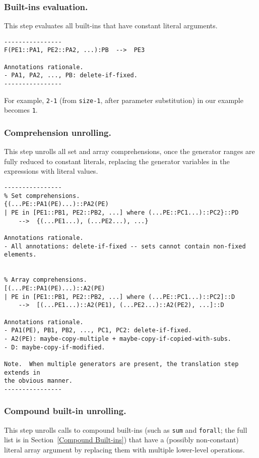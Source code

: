 \documentclass[10pt]{article}
\begin{document}
\subsubsection{Built-ins evaluation.}
This step evaluates all built-ins that have constant literal arguments.

\begin{verbatim}
----------------
F(PE1::PA1, PE2::PA2, ...):PB  -->  PE3

Annotations rationale.
- PA1, PA2, ..., PB: delete-if-fixed.
----------------
\end{verbatim}

For example, \texttt{2-1} (from \texttt{size-1}, after parameter
substitution) in our example becomes \texttt{1}.

\subsubsection{Comprehension unrolling.}
This step unrolls all set and array comprehensions, once the generator
ranges are fully reduced to constant literals, replacing the generator
variables in the expressions with literal values.

\begin{verbatim}
----------------
% Set comprehensions.
{(...PE::PA1(PE)...)::PA2(PE) 
| PE in [PE1::PB1, PE2::PB2, ...] where (...PE::PC1...)::PC2}::PD
    -->  {(...PE1...), (...PE2...), ...}

Annotations rationale.
- All annotations: delete-if-fixed -- sets cannot contain non-fixed elements.


% Array comprehensions.
[(...PE::PA1(PE)...)::A2(PE) 
| PE in [PE1::PB1, PE2::PB2, ...] where (...PE::PC1...)::PC2]::D
    -->  [(...PE1...)::A2(PE1), (...PE2...)::A2(PE2), ...]::D

Annotations rationale.
- PA1(PE), PB1, PB2, ..., PC1, PC2: delete-if-fixed.
- A2(PE): maybe-copy-multiple + maybe-copy-if-copied-with-subs.
- D: maybe-copy-if-modified.

Note.  When multiple generators are present, the translation step extends in
the obvious manner.
----------------
\end{verbatim}


\subsubsection{Compound built-in unrolling.}
This step unrolls calls to compound built-ins (such as \texttt{sum} and
\texttt{forall}; the full list is in Section~\ref{Compound
Built-ins}) that have a (possibly non-constant) literal array argument by
replacing them with multiple lower-level operations.
\end{document}
